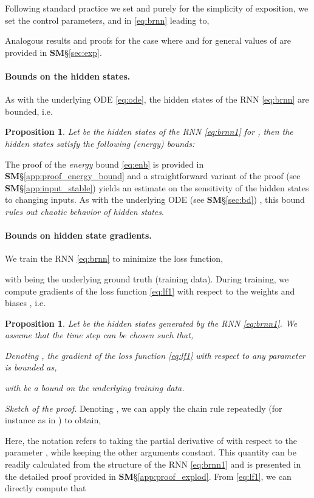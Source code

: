 \documentclass{article} \usepackage{iclr2021_conference,times}
\newtheorem{proposition}[theorem]{Proposition}
\begin{document}
Following standard practice we set  and purely for the simplicity of exposition, we set the control parameters,  and  in \eqref{eq:brnn} leading to,

Analogous results and proofs for the case where  and for general values of  are provided in {\bf SM}\S\ref{sec:exp}.
\paragraph{Bounds on the hidden states.} As with the underlying ODE \eqref{eq:ode}, the hidden states of the RNN \eqref{eq:brnn} are bounded, i.e.
\begin{proposition}
\label{prop:1}
Let  be the hidden states of the RNN \eqref{eq:brnn1} for , then the hidden states satisfy the following (energy) bounds:

\end{proposition}
The proof of the \emph{energy} bound \eqref{eq:enb} is provided in {\bf SM}\S\ref{app:proof_energy_bound} and a straightforward variant of the proof (see {\bf SM}\S\ref{app:input_stable}) yields an estimate on the sensitivity of the hidden states to changing inputs. As with the underlying ODE (see {\bf SM}\S\ref{sec:bd}) , this bound \emph{rules out chaotic behavior of hidden states}.
\paragraph{Bounds on hidden state gradients.} We train the RNN \eqref{eq:brnn} to minimize the loss function,

with  being the underlying ground truth (training data). During training, we compute gradients of the loss function \eqref{eq:lf1} with respect to the weights and biases , i.e.

\begin{proposition}
\label{prop:3}
Let  be the hidden states generated by the RNN \eqref{eq:brnn1}. We assume that the time step  can be chosen such that, 

Denoting , the gradient of the loss function  \eqref{eq:lf1} with respect to any parameter  is bounded as,

with  be a bound on the underlying training data.
\end{proposition}
\emph{Sketch of the proof.} Denoting , we can apply the chain rule repeatedly (for instance as in \cite{vanish_grad}) to obtain,

Here, the notation  refers to taking the partial derivative of  with respect to the parameter , while keeping the other arguments constant. This quantity can be readily calculated from the structure of the RNN \eqref{eq:brnn1} and is presented in the detailed proof provided in {\bf SM}\S\ref{app:proof_explod}. From \eqref{eq:lf1}, we can directly compute that  
\end{document}
